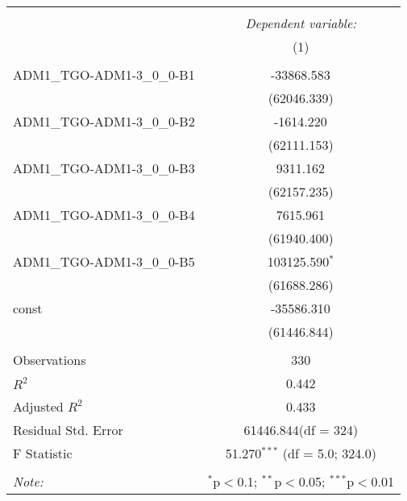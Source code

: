 \begin{table}[!htbp] \centering
\begin{tabular}{@{\extracolsep{5pt}}lc}
\\[-1.8ex]\hline
\hline \\[-1.8ex]
& \multicolumn{1}{c}{\textit{Dependent variable:}} \
\cr \cline{1-2}
\\[-1.8ex] & (1) \\
\hline \\[-1.8ex]
 ADM1_TGO-ADM1-3_0_0-B1 & -33868.583$^{}$ \\
  & (62046.339) \\
 ADM1_TGO-ADM1-3_0_0-B2 & -1614.220$^{}$ \\
  & (62111.153) \\
 ADM1_TGO-ADM1-3_0_0-B3 & 9311.162$^{}$ \\
  & (62157.235) \\
 ADM1_TGO-ADM1-3_0_0-B4 & 7615.961$^{}$ \\
  & (61940.400) \\
 ADM1_TGO-ADM1-3_0_0-B5 & 103125.590$^{*}$ \\
  & (61688.286) \\
 const & -35586.310$^{}$ \\
  & (61446.844) \\
\hline \\[-1.8ex]
 Observations & 330 \\
 $R^2$ & 0.442 \\
 Adjusted $R^2$ & 0.433 \\
 Residual Std. Error & 61446.844(df = 324)  \\
 F Statistic & 51.270$^{***}$ (df = 5.0; 324.0) \\
\hline
\hline \\[-1.8ex]
\textit{Note:} & \multicolumn{1}{r}{$^{*}$p$<$0.1; $^{**}$p$<$0.05; $^{***}$p$<$0.01} \\
\end{tabular}
\end{table}